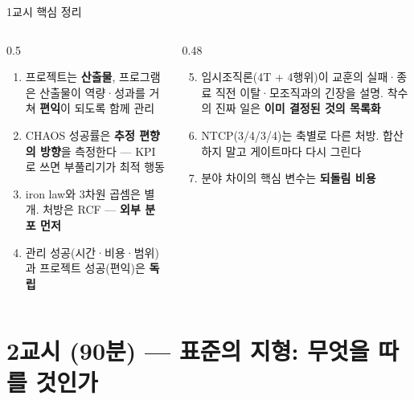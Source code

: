 \begin{frame}{1교시 핵심 정리}
\begin{columns}[T]
\begin{column}{0.5\textwidth}
\begin{enumerate}
\item 프로젝트는 \textbf{산출물}, 프로그램은 산출물이 역량·성과를 거쳐 \textbf{편익}이 되도록 함께 관리
\item CHAOS 성공률은 \textbf{추정 편향의 방향}을 측정한다 — KPI로 쓰면 부풀리기가 최적 행동
\item iron law와 3차원 곱셈은 별개. 처방은 RCF — \textbf{외부 분포 먼저}
\item 관리 성공(시간·비용·범위)과 프로젝트 성공(편익)은 \textbf{독립}
\end{enumerate}
\end{column}
\begin{column}{0.48\textwidth}
\begin{enumerate}\setcounter{enumi}{4}
\item 임시조직론(4T + 4행위)이 교훈의 실패·종료 직전 이탈·모조직과의 긴장을 설명. 착수의 진짜 일은 \textbf{이미 결정된 것의 목록화}
\item NTCP(3/4/3/4)는 축별로 다른 처방. 합산하지 말고 게이트마다 다시 그린다
\item 분야 차이의 핵심 변수는 \textbf{되돌림 비용}
\end{enumerate}
\end{column}
\end{columns}
\end{frame}

\section{2교시 (90분) — 표준의 지형: 무엇을 따를 것인가}

